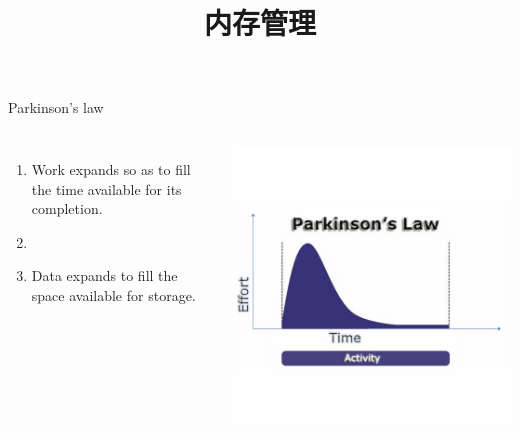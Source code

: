 \documentclass[xcolor=svgnames]{beamer}
\begin{document}
\begin{CJK*}{UTF8}{gbsn}


\title{内存管理}

\begin{frame}
\maketitle
\end{frame}
\begin{frame}{Parkinson's law}
\begin{columns}%
\begin{enumerate}
\item Work expands so as to fill the time available for its completion.
\item[]
\item Data expands to fill the space available for storage.
\end{enumerate}
\includegraphics[width=1.0\textwidth]{parkinson.jpg}
\end{columns}%
\end{frame}


\end{CJK*}
\end{document}
